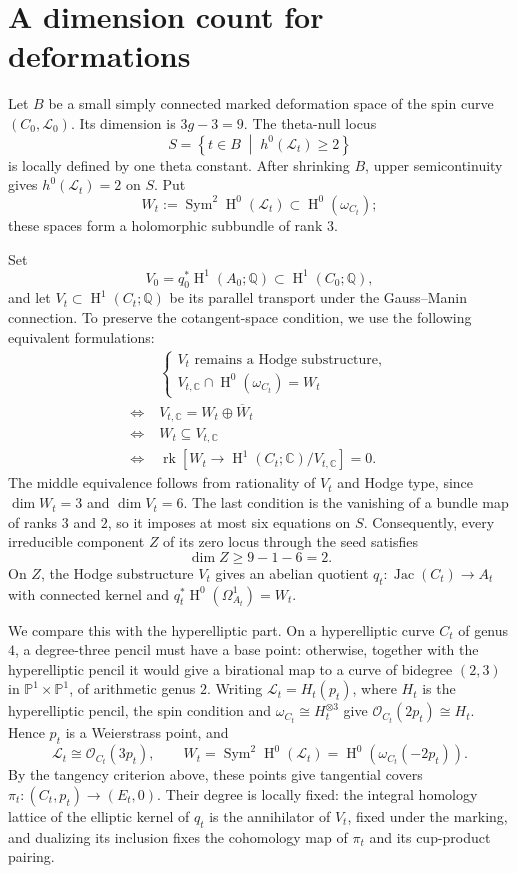 \documentclass{amsart}
\DeclareMathOperator{\Sym}{Sym}
\DeclareMathOperator{\Hnm}{H}
\DeclareMathOperator{\Jac}{Jac}
\DeclareMathOperator{\rk}{rk}
\begin{document}
\section{A dimension count for deformations}

Let $B$ be a small simply connected marked deformation space of the spin
curve $(C_0,\mathcal{L}_0)$. Its dimension is $3g-3=9$. The theta-null
locus
\[
S=\left\{t\in B\;\middle|\;h^0(\mathcal{L}_t)\geqslant2\right\}
\]
is locally defined by one theta constant. After shrinking $B$, upper
semicontinuity gives $h^0(\mathcal{L}_t)=2$ on $S$. Put
\[
W_t:=\Sym^2\Hnm^0(\mathcal{L}_t)\subset\Hnm^0(\omega_{C_t});
\]
these spaces form a holomorphic subbundle of rank $3$.

Set
\[
V_0=q_0^*\Hnm^1(A_0;\mathbb{Q})
\subset\Hnm^1(C_0;\mathbb{Q}),
\]
and let $V_t\subset\Hnm^1(C_t;\mathbb{Q})$ be its parallel transport
under the Gauss--Manin connection. To preserve the cotangent-space
condition, we use the following equivalent formulations:
\[
\begin{aligned}
&\begin{cases}
V_t\text{ remains a Hodge substructure},\\
V_{t,\mathbb{C}}\cap\Hnm^0(\omega_{C_t})=W_t
\end{cases}\\
\Longleftrightarrow\;& V_{t,\mathbb{C}}=W_t\oplus\overline{W}_t\\
\Longleftrightarrow\;& W_t\subseteq V_{t,\mathbb{C}}\\
\Longleftrightarrow\;&
\rk\left[W_t\longrightarrow\Hnm^1(C_t;\mathbb{C})/V_{t,\mathbb{C}}\right]=0.
\end{aligned}
\]
The middle equivalence follows from rationality of $V_t$ and Hodge type,
since $\dim W_t=3$ and $\dim V_t=6$. The last condition is the vanishing
of a bundle map of ranks $3$ and $2$, so it imposes at most six equations
on $S$. Consequently, every irreducible component $Z$ of its zero locus
through the seed satisfies
\[
\dim Z\geqslant9-1-6=2.
\]
On $Z$, the Hodge substructure $V_t$ gives an abelian quotient
$q_t:\Jac(C_t)\longrightarrow A_t$ with connected kernel and
$q_t^*\Hnm^0(\Omega_{A_t}^1)=W_t$.

We compare this with the hyperelliptic part. On a hyperelliptic curve
$C_t$ of genus $4$, a degree-three pencil must have a base point:
otherwise, together with the hyperelliptic pencil it would give a
birational map to a curve of bidegree $(2,3)$ in
$\mathbb{P}^1\times\mathbb{P}^1$, of arithmetic genus $2$.
Writing $\mathcal{L}_t=H_t(p_t)$, where $H_t$ is the hyperelliptic pencil,
the spin condition and $\omega_{C_t}\cong H_t^{\otimes3}$ give
$\mathcal{O}_{C_t}(2p_t)\cong H_t$. Hence $p_t$ is a Weierstrass point,
and
\[
\mathcal{L}_t\cong\mathcal{O}_{C_t}(3p_t),\qquad
W_t=\Sym^2\Hnm^0(\mathcal{L}_t)
=\Hnm^0\left(\omega_{C_t}(-2p_t)\right).
\]
By the tangency criterion above, these points give tangential covers
$\pi_t:(C_t,p_t)\longrightarrow(E_t,0)$. Their degree is locally fixed:
the integral homology lattice of the elliptic kernel of $q_t$ is the
annihilator of $V_t$, fixed under the marking, and dualizing its inclusion
fixes the cohomology map of $\pi_t$ and its cup-product pairing.
\end{document}
